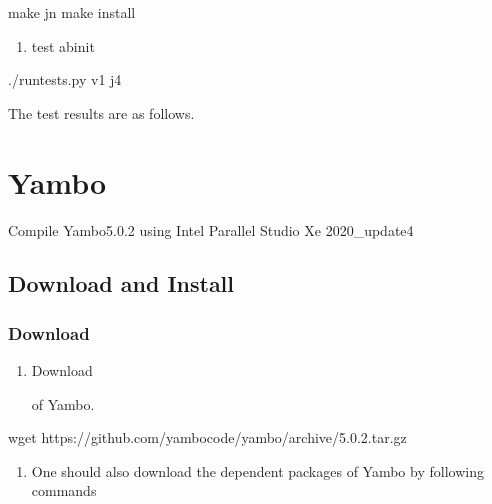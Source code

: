 \documentclass[a4paper,12pt,english]{sphinxmanual}
\begin{document}
\begin{sphinxVerbatim}[commandchars=\\\{\}]
make \PYGZhy{}j\PYGZlt{}n\PYGZgt{}  make install
\end{sphinxVerbatim}
\begin{enumerate}
%
\setcounter{enumi}{6}
\item {} 
\sphinxAtStartPar
test abinit

\end{enumerate}

\begin{sphinxVerbatim}[commandchars=\\\{\}]
./runtests.py v1 \PYGZhy{}j4
\end{sphinxVerbatim}

\sphinxAtStartPar
The test results are as follows.

\noindent{}


\section{Yambo}
\label{\detokenize{compile:yambo}}
\sphinxAtStartPar
Compile Yambo\sphinxhyphen{}5.0.2 using Intel Parallel Studio Xe 2020\_update4


\subsection{Download and Install}
\label{\detokenize{compile/yambo_5.0.2:download-and-install}}\label{\detokenize{compile/yambo_5.0.2::doc}}

\subsubsection{Download}
\label{\detokenize{compile/yambo_5.0.2:download}}\begin{enumerate}
%
\item {} 
\sphinxAtStartPar
Download %
\begin{footnote}[9]\sphinxAtStartFootnote
{}
%
\end{footnote} of Yambo.

\end{enumerate}

\begin{sphinxVerbatim}[commandchars=\\\{\}]
wget https://github.com/yambo\PYGZhy{}code/yambo/archive/5.0.2.tar.gz
\end{sphinxVerbatim}
\begin{enumerate}
%
\setcounter{enumi}{1}
\item {} 
\sphinxAtStartPar
One should also download the dependent packages of Yambo by following commands

\end{enumerate}
\end{document}
